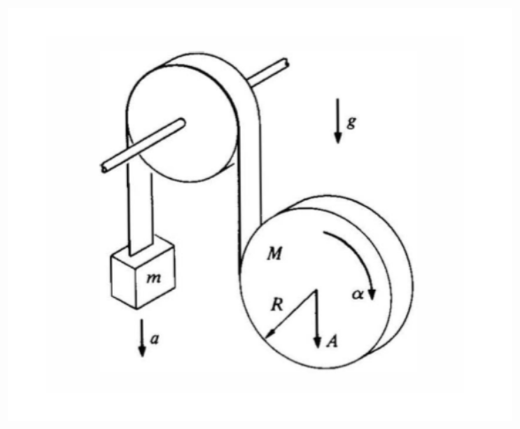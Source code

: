\documentclass[10pt]{article}
\begin{document}
	\begin{center}
		\includegraphics[scale=0.8]{q3.png}
	\end{center}
\end{document}
